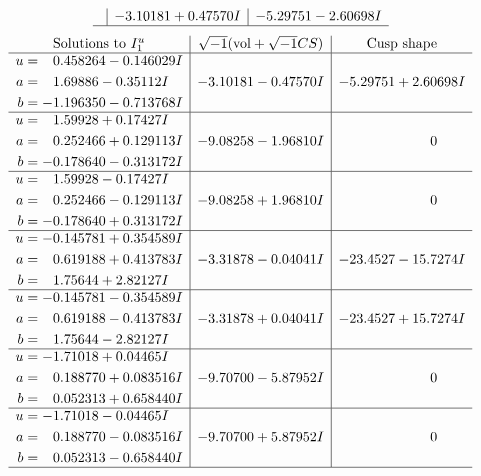 \documentclass[1p]{elsarticle_modified}
\theoremstyle{definition}
\newcommand{\I}{\sqrt{-1}}
\begin{document}
$$\begin{array}{c|c|c}
 & -3.10181 + 0.47570 I & -5.29751 - 2.60698 I\\
 \hline 
 \end{array}$$\newpage$$\begin{array}{c|c|c}  
\text{Solutions to }I^u_{1}& \I (\text{vol} + \sqrt{-1}CS) & \text{Cusp shape}\\
 \hline 
\begin{aligned}
u &= \phantom{-}0.458264 - 0.146029 I \\
a &= \phantom{-}1.69886 - 0.35112 I \\
b &= -1.196350 - 0.713768 I\end{aligned}
 & -3.10181 - 0.47570 I & -5.29751 + 2.60698 I \\ \hline\begin{aligned}
u &= \phantom{-}1.59928 + 0.17427 I \\
a &= \phantom{-}0.252466 + 0.129113 I \\
b &= -0.178640 - 0.313172 I\end{aligned}
 & -9.08258 - 1.96810 I & \phantom{-0.000000 } 0 \\ \hline\begin{aligned}
u &= \phantom{-}1.59928 - 0.17427 I \\
a &= \phantom{-}0.252466 - 0.129113 I \\
b &= -0.178640 + 0.313172 I\end{aligned}
 & -9.08258 + 1.96810 I & \phantom{-0.000000 } 0 \\ \hline\begin{aligned}
u &= -0.145781 + 0.354589 I \\
a &= \phantom{-}0.619188 + 0.413783 I \\
b &= \phantom{-}1.75644 + 2.82127 I\end{aligned}
 & -3.31878 - 0.04041 I & -23.4527 - 15.7274 I \\ \hline\begin{aligned}
u &= -0.145781 - 0.354589 I \\
a &= \phantom{-}0.619188 - 0.413783 I \\
b &= \phantom{-}1.75644 - 2.82127 I\end{aligned}
 & -3.31878 + 0.04041 I & -23.4527 + 15.7274 I \\ \hline\begin{aligned}
u &= -1.71018 + 0.04465 I \\
a &= \phantom{-}0.188770 + 0.083516 I \\
b &= \phantom{-}0.052313 + 0.658440 I\end{aligned}
 & -9.70700 - 5.87952 I & \phantom{-0.000000 } 0 \\ \hline\begin{aligned}
u &= -1.71018 - 0.04465 I \\
a &= \phantom{-}0.188770 - 0.083516 I \\
b &= \phantom{-}0.052313 - 0.658440 I\end{aligned}
 & -9.70700 + 5.87952 I & \phantom{-0.000000 } 0\\
 \hline 
 \end{array}$$\newpage\newpage\renewcommand{\arraystretch}{1}
\end{document}
